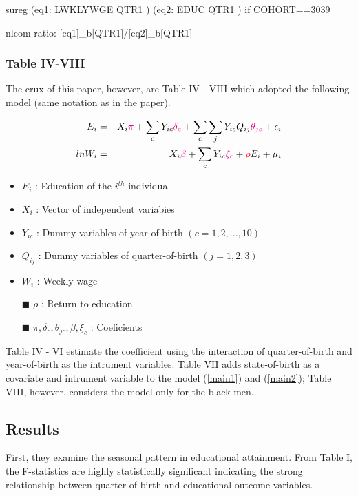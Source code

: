 \documentclass{article}
\begin{document}
\begin{tcolorbox}
sureg (eq1:  LWKLYWGE QTR1 ) (eq2:  EDUC QTR1 ) if COHORT==3039

nlcom ratio: [eq1]\_b[QTR1]/[eq2]\_b[QTR1]
\end{tcolorbox}

\subsubsection{Table IV-VIII}
The crux of this paper, however, are Table IV - VIII which adopted the following model (same notation as in the paper).

\begin{eqnarray}
 \label{main1}
  E_i &=& X_i \textcolor{magenta}{\pi} + \displaystyle\sum_{c} Y_{ic} \textcolor{magenta}{\delta _c} + \displaystyle\sum_{c} \displaystyle\sum_{j} Y_{ic}Q_{ij}\textcolor{magenta}{\theta _{jc}}+ \epsilon_i \\
  \label{main2}
  ln W_i &=&  X_i \textcolor{magenta}{\beta} + \displaystyle\sum_{c} Y_{ic}\textcolor{magenta}{\xi _c} + \textcolor{red}{\rho} E_i + \mu _i 
\end{eqnarray}

\begin{itemize}
\item $E_i$ : Education of the $i^{th}$ individual 
\item $X_i$ : Vector of independent variabies 
\item $Y_{ic}$ : Dummy variables of year-of-birth $(c=1, 2,..., 10)$
\item $Q_{ij}$ : Dummy variables of quarter-of-birth $(j=1, 2, 3)$
\item $W_i$ : Weekly wage
\item[$\blacksquare$] $\rho$ : Return to education
\item[$\blacksquare$] $\pi, \delta _c, \theta _{jc}, \beta, \xi _c$ : Coeficients
\end{itemize}

Table IV - VI estimate the coefficient using the interaction of quarter-of-birth and year-of-birth as the intrument variables.
Table VII adds state-of-birth as a covariate and intrument variable to the model (\ref{main1}) and (\ref{main2}); Table VIII, however, considers the model only for the black men.

\subsection{Results}
First, they examine the seasonal pattern in educational attainment. From Table I, the F-statistics are highly statistically significant indicating the strong relationship between quarter-of-birth and educational outcome variables.
\end{document}

